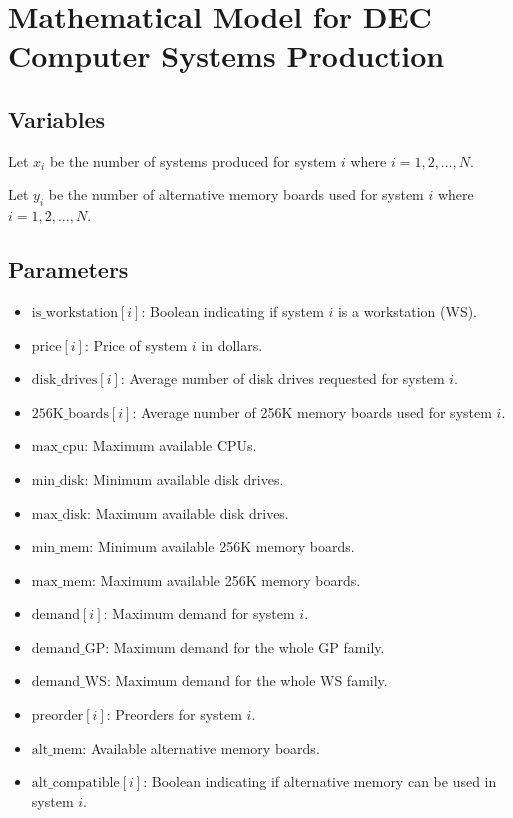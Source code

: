 \documentclass{article}
\begin{document}
\section*{Mathematical Model for DEC Computer Systems Production}

\subsection*{Variables}

Let \( x_i \) be the number of systems produced for system \( i \) where \( i = 1, 2, \ldots, N \).

Let \( y_i \) be the number of alternative memory boards used for system \( i \) where \( i = 1, 2, \ldots, N \).

\subsection*{Parameters}

\begin{itemize}
    \item \( \text{is\_workstation}[i] \): Boolean indicating if system \( i \) is a workstation (WS).
    \item \( \text{price}[i] \): Price of system \( i \) in dollars.
    \item \( \text{disk\_drives}[i] \): Average number of disk drives requested for system \( i \).
    \item \( \text{256K\_boards}[i] \): Average number of 256K memory boards used for system \( i \).
    \item \( \text{max\_cpu} \): Maximum available CPUs.
    \item \( \text{min\_disk} \): Minimum available disk drives.
    \item \( \text{max\_disk} \): Maximum available disk drives.
    \item \( \text{min\_mem} \): Minimum available 256K memory boards.
    \item \( \text{max\_mem} \): Maximum available 256K memory boards.
    \item \( \text{demand}[i] \): Maximum demand for system \( i \).
    \item \( \text{demand\_GP} \): Maximum demand for the whole GP family.
    \item \( \text{demand\_WS} \): Maximum demand for the whole WS family.
    \item \( \text{preorder}[i] \): Preorders for system \( i \).
    \item \( \text{alt\_mem} \): Available alternative memory boards.
    \item \( \text{alt\_compatible}[i] \): Boolean indicating if alternative memory can be used in system \( i \).
\end{itemize}
\end{document}
